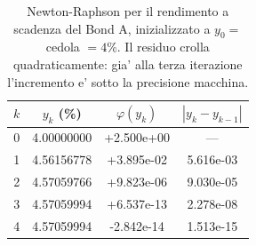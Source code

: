 \begin{table}[H]\centering\small
\caption{Newton-Raphson per il rendimento a scadenza del Bond A, inizializzato a $y_0=$ cedola $=4\%$. Il residuo crolla quadraticamente: gia' alla terza iterazione l'incremento e' sotto la precisione macchina.}
\label{tab:newton-ytm}\renewcommand{\arraystretch}{1.1}
\begin{tabular}{rccc}
\toprule
$k$ & $y_k$ (\%) & $\varphi(y_k)$ & $|y_k-y_{k-1}|$\\
\midrule
\rowcolor{rowtint}0 & 4.00000000 & +2.500e+00 & ---\\
1 & 4.56156778 & +3.895e-02 & 5.616e-03\\
\rowcolor{rowtint}2 & 4.57059766 & +9.823e-06 & 9.030e-05\\
3 & 4.57059994 & +6.537e-13 & 2.278e-08\\
\rowcolor{rowtint}4 & 4.57059994 & -2.842e-14 & 1.513e-15\\
\bottomrule
\end{tabular}
\end{table}
